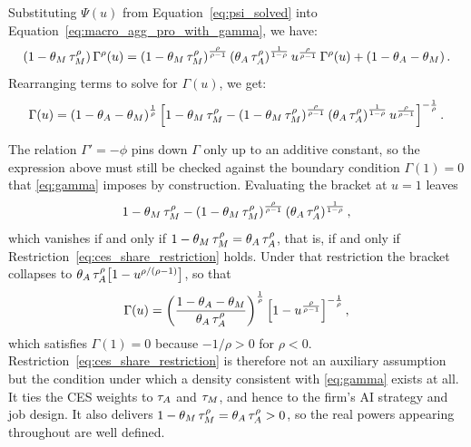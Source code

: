 Substituting \( \Psi(u) \) from Equation~\eqref{eq:psi_solved} into Equation~\eqref{eq:macro_agg_pro_with_gamma}, we have:
\[
\left(1-\theta_{M}\,\tau_{M}^{\rho}\right)\Gamma^{\rho}(u)=\left(1-\theta_{M}\,\tau_{M}^{\rho}\right)^{\frac{\rho}{\rho-1}}\left(\theta_{A}\,\tau_{A}^{\rho}\right)^{\frac{1}{1-\rho}}u^{\frac{\rho}{\rho-1}}\,\Gamma^{\rho}(u)+\left(1-\theta_{A}-\theta_{M}\right).
\]
Rearranging terms to solve for \( \Gamma(u) \), we get:
\[
\Gamma(u)=\left(1-\theta_{A}-\theta_{M}\right)^{\frac{1}{\rho}}\left[1-\theta_{M}\,\tau_{M}^{\rho}-\left(1-\theta_{M}\,\tau_{M}^{\rho}\right)^{\frac{\rho}{\rho-1}}\left(\theta_{A}\,\tau_{A}^{\rho}\right)^{\frac{1}{1-\rho}}u^{\frac{\rho}{\rho-1}}\right]^{-\frac{1}{\rho}}.
\]

The relation $\Gamma'=-\phi$ pins down $\Gamma$ only up to an additive constant, so the expression above must still be checked against the boundary condition $\Gamma(1)=0$ that \eqref{eq:gamma} imposes by construction.
Evaluating the bracket at $u=1$ leaves
\[
1-\theta_{M}\,\tau_{M}^{\rho}-\left(1-\theta_{M}\,\tau_{M}^{\rho}\right)^{\frac{\rho}{\rho-1}}\left(\theta_{A}\,\tau_{A}^{\rho}\right)^{\frac{1}{1-\rho}},
\]
which vanishes if and only if $1-\theta_{M}\,\tau_{M}^{\rho}=\theta_{A}\,\tau_{A}^{\rho}$, that is, if and only if Restriction~\eqref{eq:ces_share_restriction} holds.
Under that restriction the bracket collapses to $\theta_{A}\,\tau_{A}^{\rho}\bigl[1-u^{\rho/(\rho-1)}\bigr]$, so that
\begin{equation}
\Gamma(u)=\left(\frac{1-\theta_{A}-\theta_{M}}{\theta_{A}\,\tau_{A}^{\rho}}\right)^{\frac{1}{\rho}}\left[1-u^{\frac{\rho}{\rho-1}}\right]^{-\frac{1}{\rho}},
\label{eq:gamma_solved}
\end{equation}
which satisfies $\Gamma(1)=0$ because $-1/\rho>0$ for $\rho<0$.
Restriction~\eqref{eq:ces_share_restriction} is therefore not an auxiliary assumption but the condition under which a density consistent with \eqref{eq:gamma} exists at all.
It ties the CES weights to $\tau_{A}$ and $\tau_{M}$, and hence to the firm's AI strategy and job design.
It also delivers $1-\theta_{M}\,\tau_{M}^{\rho}=\theta_{A}\,\tau_{A}^{\rho}>0$, so the real powers appearing throughout are well defined.

